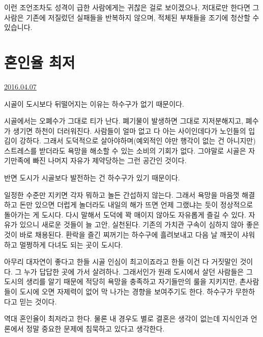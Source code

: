 이런 조언조차도 성격이 급한 사람에게는 귀찮은 걸로 보이겠으나,
저대로만 한다면 그 사람은 기존에 저질렀던 실패들을 반복하지 않으며, 적체된 부채들을 조기에 청산할 수 있습니다.
\vspace{5mm}






\section{혼인율 최저}
\href{https://www.kockoc.com/Apoc/715867}{2016.04.07}

\vspace{5mm}

시골이 도시보다 뒤떨어지는 이유는 하수구가 없기 때문이다.
\vspace{5mm}

시골에서는 오폐수가 그대로 티가 난다. 폐기물이 발생하면 그대로 지저분해지고, 폐수가 생기면 하천이 더러워진다.
사람들이 얼마 없고 다 아는 사이인데다가 노인들의 입김이 강하다.
그래서 도덕적으로 살아야하며(예외적인 야만 행각이 없는 건 아니지만)
스트레스를 받더라도 욕망을 해소할 수 있는 소비의 기회가 없다.
그야말로 시골은 자기만족에 빠진 나머지 자유가 제약당하는 그런 공간인 것이다.
\vspace{5mm}

반면 도시가 시골보다 발전하는 건 하수구가 있기 때문이다.
\vspace{5mm}

일정한 수준만 지키면 각자 뭐하고 놀든 간섭하지 않는다.
그래서 욕망을 마음껏 해결하고 돈만 있으면 더럽게 놀더라도 내일의 해가 뜨면
언제 그랬냐는 듯이 정상적으로 돌아가는 게 도시다.
다시 말해서 도덕에 꽉 매이지 않아도 자유롭게 즐길 수 있다.
자유가 있으니 새로운 것들이 늘 고안, 실천된다. 기존의 가치관 구속이 심하지 않아 좋은 것이 바로 채용된다.
환락을 즐긴 찌꺼기는 하수구에 흘려보내고 다음 날 깨끗이 샤워하고 멀쩡하게 다녀도 되는 곳이 도시다.
\vspace{5mm}

아무리 대자연이 좋다고 한들 시골 인심이 최고이죠라고 한들 이건 다 거짓말인 것이다.
그 누가 답답한 곳에 가서 살려하나.
그래서인가 원래 도시에서 살던 사람들은 그 도시의 생리를 알기 때문에 적당히 욕망을 충족하고 자기들만의 룰을 지키지만,
촌사람들이 도시에 오면 자제력이 없어 막 나가는 경향을 보여주기도 한다. 하수구가 무한하다고 믿는 것이다.
\vspace{5mm}

역대 혼인율이 최저라고 한다. 물론 내 경우도 별로 결혼은 생각이 없는데 지식인과 언론에서 정말 중요한 문제에 침묵하고 있다고 생각한다.
\vspace{5mm}

